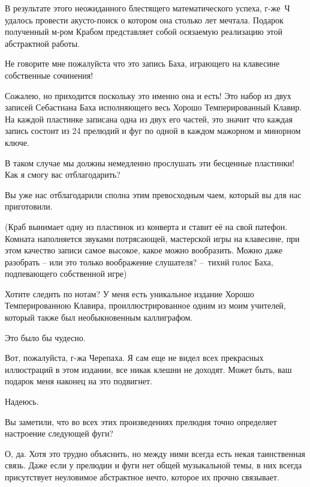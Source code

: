\documentclass[../main.tex]{subfiles}
\begin{document}
\begin{dialogue}
 В результате этого неожиданного блестящего математического успеха, г-же~Ч удалось провести акусто-поиск о котором она столько лет мечтала. Подарок полученный м-ром Крабом представляет собой осязаемую реализацию этой абстрактной работы.

 Не говорите мне пожалуйста что это запись Баха, играющего на клавесине собственные сочинения!

 Сожалею, но приходится поскольку это именно она и есть! Это набор из двух записей Себастиана Баха исполняющего весь Хорошо Темперированный Клавир. На каждой пластинке записана одна из двух его частей, это значит что каждая запись состоит из 24 прелюдий и фуг по одной в каждом мажорном и минорном ключе.

 В таком случае мы должны немедленно прослушать эти бесценные пластинки! Как я смогу вас отблагодарить?

 Вы уже нас отблагодарили сполна этим превосходным чаем, который вы для нас приготовили.

(Краб вынимает одну из пластинок из конверта и ставит её на свой патефон. Комната наполняется звуками потрясающей, мастерской игры на клавесине, при этом качество записи самое высокое, какое можно вообразить. Можно даже разобрать \--- или это только воображение слушателя? \---~тихий голос Баха, подпевающего собственной игре)

 Хотите следить по нотам? У меня есть уникальное издание Хорошо Темперированною Клавира, проиллюстрированное одним из моим учителей, который также был необыкновенным каллиграфом.

 Это было бы чудесно.


 Вот, пожалуйста, г-жа Черепаха. Я сам еще не видел всех прекрасных иллюстраций в этом издании, все никак клешни не доходят. Может быть, ваш подарок меня наконец на это подвигнет.

 Надеюсь.

 Вы заметили, что во всех этих произведениях прелюдия точно определяет настроение следующей фуги?

 О, да. Хотя это трудно объяснить, но между ними всегда есть некая таинственная связь. Даже если у прелюдии и фуги нет общей музыкальной темы, в них всегда присутствует неуловимое абстрактное нечто, которое их прочно связывает.


\end{dialogue}
\end{document}
